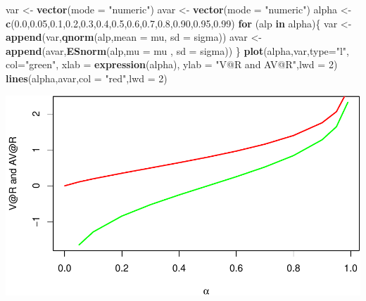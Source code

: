 \documentclass[]{article}
\newenvironment{Shaded}{\begin{snugshade}}{\end{snugshade}}
\newcommand{\KeywordTok}[1]{\textcolor[rgb]{0.13,0.29,0.53}{\textbf{#1}}}
\newcommand{\DataTypeTok}[1]{\textcolor[rgb]{0.13,0.29,0.53}{#1}}
\newcommand{\DecValTok}[1]{\textcolor[rgb]{0.00,0.00,0.81}{#1}}
\newcommand{\FloatTok}[1]{\textcolor[rgb]{0.00,0.00,0.81}{#1}}
\newcommand{\StringTok}[1]{\textcolor[rgb]{0.31,0.60,0.02}{#1}}
\newcommand{\ControlFlowTok}[1]{\textcolor[rgb]{0.13,0.29,0.53}{\textbf{#1}}}
\newcommand{\NormalTok}[1]{#1}
\begin{document}
\begin{Shaded}
\begin{Highlighting}[]
\NormalTok{var <-}\StringTok{ }\KeywordTok{vector}\NormalTok{(}\DataTypeTok{mode =} \StringTok{"numeric"}\NormalTok{)}
\NormalTok{avar <-}\StringTok{ }\KeywordTok{vector}\NormalTok{(}\DataTypeTok{mode =} \StringTok{"numeric"}\NormalTok{)}
\NormalTok{alpha <-}\StringTok{ }\KeywordTok{c}\NormalTok{(}\FloatTok{0.0}\NormalTok{,}\FloatTok{0.05}\NormalTok{,}\FloatTok{0.1}\NormalTok{,}\FloatTok{0.2}\NormalTok{,}\FloatTok{0.3}\NormalTok{,}\FloatTok{0.4}\NormalTok{,}\FloatTok{0.5}\NormalTok{,}\FloatTok{0.6}\NormalTok{,}\FloatTok{0.7}\NormalTok{,}\FloatTok{0.8}\NormalTok{,}\FloatTok{0.90}\NormalTok{,}\FloatTok{0.95}\NormalTok{,}\FloatTok{0.99}\NormalTok{)}
\ControlFlowTok{for}\NormalTok{ (alp }\ControlFlowTok{in}\NormalTok{ alpha)\{}
\NormalTok{  var <-}\StringTok{ }\KeywordTok{append}\NormalTok{(var,}\KeywordTok{qnorm}\NormalTok{(alp,}\DataTypeTok{mean =}\NormalTok{ mu, }\DataTypeTok{sd =}\NormalTok{ sigma))}
\NormalTok{  avar <-}\StringTok{ }\KeywordTok{append}\NormalTok{(avar,}\KeywordTok{ESnorm}\NormalTok{(alp,}\DataTypeTok{mu =}\NormalTok{ mu , }\DataTypeTok{sd =}\NormalTok{ sigma))}
\NormalTok{\}}
\KeywordTok{plot}\NormalTok{(alpha,var,}\DataTypeTok{type=}\StringTok{"l"}\NormalTok{, }\DataTypeTok{col=}\StringTok{"green"}\NormalTok{, }\DataTypeTok{xlab =} \KeywordTok{expression}\NormalTok{(alpha), }\DataTypeTok{ylab =} \StringTok{"V@R and AV@R"}\NormalTok{,}\DataTypeTok{lwd =} \DecValTok{2}\NormalTok{)}
\KeywordTok{lines}\NormalTok{(alpha,avar,}\DataTypeTok{col =} \StringTok{"red"}\NormalTok{,}\DataTypeTok{lwd =} \DecValTok{2}\NormalTok{)}
\end{Highlighting}
\end{Shaded}

\includegraphics{Integrated_Management_Formulation_Model_files/figure-latex/unnamed-chunk-28-2.pdf}
\end{document}
